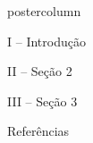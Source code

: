 \begin{column}{.45\textwidth}
	\begin{beamercolorbox}[center,wd=\textwidth]{postercolumn}
		\begin{minipage}[T]{.95\textwidth} 
			\parbox[t][\columnheight]{\textwidth}{
				\begin{block}{\vspace*{-7pt} \large I -- Introdução}                    
				\end{block}
				
				\vspace*{14pt}
				
				\begin{block}{\vspace*{-7pt} \large II -- Seção 2}
				\end{block}   
				
				\vspace*{14pt}            
				
				\begin{block}{\vspace*{-7pt} \large III -- Seção 3}
				\end{block}
				
				\vspace*{14pt}
				
				\begin{block}{\vspace*{-7pt} \large Referências}
					
					
				\end{block}
			}
		\end{minipage}
	\end{beamercolorbox}
\end{column}